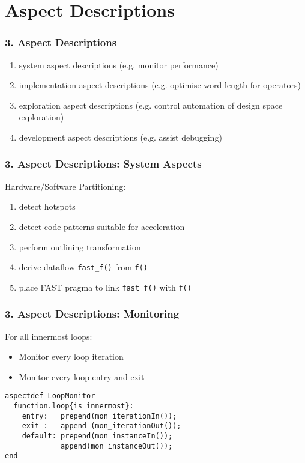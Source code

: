 \section{Aspect Descriptions}
\begin{frame}
  \frametitle{3. Aspect Descriptions}
\begin{enumerate}
  \item  system aspect descriptions (e.g. monitor performance)
  \item implementation aspect descriptions (e.g. optimise word-length for operators)
  \item exploration aspect descriptions (e.g. control automation of design space exploration)
  \item development aspect descriptions (e.g. assist debugging)
\end{enumerate}

\end{frame}


\begin{frame}
  \frametitle{3. Aspect Descriptions: System Aspects}
Hardware/Software Partitioning:
\begin{enumerate}
  \item detect hotspots
  \item detect code patterns suitable for acceleration
  \item perform outlining transformation
  \item derive dataflow \texttt{fast\_f()} from \texttt{f()}
  \item place FAST pragma to link \texttt{fast\_f()} with \texttt{f()}
\end{enumerate}
\end{frame}


\begin{frame}[fragile]
  \frametitle{3. Aspect Descriptions: Monitoring}
  For all innermost loops:
\begin{itemize}
  \item Monitor every loop iteration
  \item Monitor every loop entry and exit
\end{itemize}
\begin{lstlisting}[label=lst:label, style=lara]
aspectdef LoopMonitor
  function.loop{is_innermost}:
    entry:   prepend(mon_iterationIn());
    exit :   append (mon_iterationOut());
    default: prepend(mon_instanceIn());
             append(mon_instanceOut());
end
\end{lstlisting}
\end{frame}

